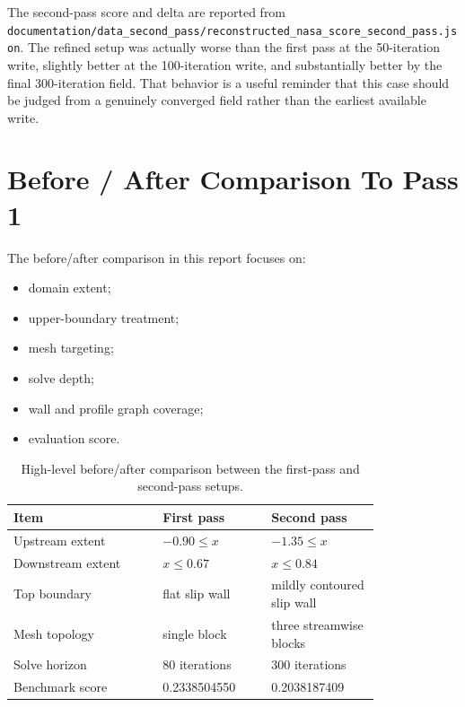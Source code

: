 \documentclass[11pt]{article}
\begin{document}
The second-pass score and delta are reported from \texttt{documentation/data\_second\_pass/reconstructed\_nasa\_score\_second\_pass.json}. The refined setup was actually worse than the first pass at the 50-iteration write, slightly better at the 100-iteration write, and substantially better by the final 300-iteration field. That behavior is a useful reminder that this case should be judged from a genuinely converged field rather than the earliest available write.

\section{Before / After Comparison To Pass 1}
The before/after comparison in this report focuses on:
\begin{itemize}
\item domain extent;
\item upper-boundary treatment;
\item mesh targeting;
\item solve depth;
\item wall and profile graph coverage;
\item evaluation score.
\end{itemize}

\begin{table}[H]
\centering
\begin{tabular}{p{0.33\linewidth} p{0.24\linewidth} p{0.24\linewidth}}
\toprule
Item & First pass & Second pass \\
\midrule
Upstream extent & \(-0.90 \le x\) & \(-1.35 \le x\) \\
Downstream extent & \(x \le 0.67\) & \(x \le 0.84\) \\
Top boundary & flat slip wall & mildly contoured slip wall \\
Mesh topology & single block & three streamwise blocks \\
Solve horizon & 80 iterations & 300 iterations \\
Benchmark score & 0.2338504550 & 0.2038187409 \\
\bottomrule
\end{tabular}
\caption{High-level before/after comparison between the first-pass and second-pass setups.}
\end{table}
\end{document}
